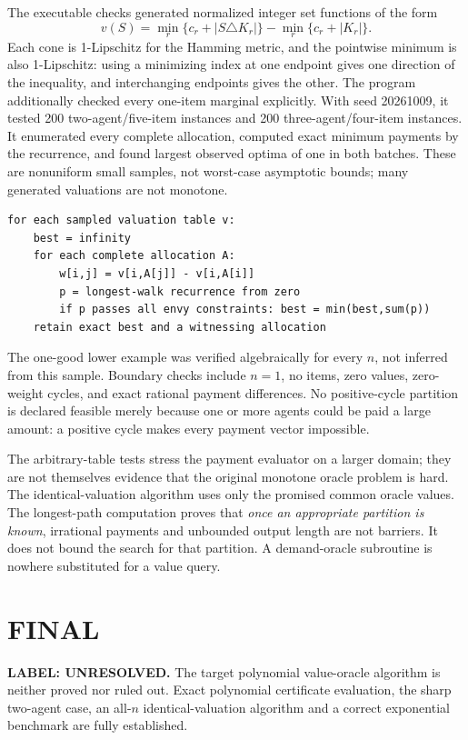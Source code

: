 \documentclass[11pt,a4paper]{article}
\theoremstyle{remark}\newtheorem{remark}[theorem]{Remark}
\begin{document}
The executable checks generated normalized integer set functions of the form
\[
v(S)=\min_r\{c_r+|S\triangle K_r|\}-\min_r\{c_r+|K_r|\}.
\]
Each cone is 1-Lipschitz for the Hamming metric, and the pointwise minimum is also 1-Lipschitz: using a minimizing index at one endpoint gives one direction of the inequality, and interchanging endpoints gives the other. The program additionally checked every one-item marginal explicitly. With seed 20261009, it tested 200 two-agent/five-item instances and 200 three-agent/four-item instances. It enumerated every complete allocation, computed exact minimum payments by the recurrence, and found largest observed optima of one in both batches. These are nonuniform small samples, not worst-case asymptotic bounds; many generated valuations are not monotone.
\begin{lstlisting}
for each sampled valuation table v:
    best = infinity
    for each complete allocation A:
        w[i,j] = v[i,A[j]] - v[i,A[i]]
        p = longest-walk recurrence from zero
        if p passes all envy constraints: best = min(best,sum(p))
    retain exact best and a witnessing allocation
\end{lstlisting}
The one-good lower example was verified algebraically for every $n$, not inferred from this sample. Boundary checks include $n=1$, no items, zero values, zero-weight cycles, and exact rational payment differences. No positive-cycle partition is declared feasible merely because one or more agents could be paid a large amount: a positive cycle makes every payment vector impossible.

The arbitrary-table tests stress the payment evaluator on a larger domain; they are not themselves evidence that the original monotone oracle problem is hard. The identical-valuation algorithm uses only the promised common oracle values. The longest-path computation proves that \emph{once an appropriate partition is known}, irrational payments and unbounded output length are not barriers. It does not bound the search for that partition. A demand-oracle subroutine is nowhere substituted for a value query.

\section{FINAL}
\textbf{LABEL: UNRESOLVED.}
The target polynomial value-oracle algorithm is neither proved nor ruled out. Exact polynomial certificate evaluation, the sharp two-agent case, an all-$n$ identical-valuation algorithm and a correct exponential benchmark are fully established.
\end{document}
